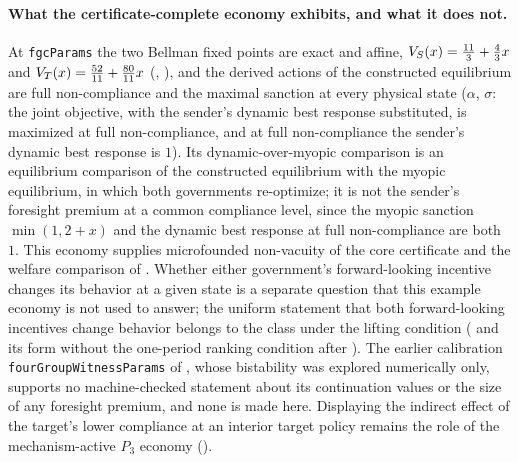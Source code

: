 \paragraph{What the certificate-complete economy exhibits, and what it does not.}
At \texttt{fgcParams} the two Bellman fixed points are exact and affine,
$V_S(x)=\tfrac{11}{3}+\tfrac43x$ and $V_T(x)=\tfrac{52}{11}+\tfrac{80}{11}x$
(, ), and the derived
actions of the constructed equilibrium are full non-compliance and the maximal
sanction at every physical state ($\alpha$,
$\sigma$: the joint objective, with the
sender's dynamic best response substituted, is maximized at full non-compliance, and at full
non-compliance the sender's dynamic best response is $1$). Its dynamic-over-myopic
comparison is an equilibrium comparison of the constructed equilibrium with the
myopic equilibrium, in which both governments re-optimize; it is not the
sender's foresight premium at a common compliance level, since the myopic sanction
$\min(1,2+x)$ and the dynamic best response at full non-compliance are both $1$. This economy supplies
microfounded non-vacuity of the core certificate and the welfare comparison
of . Whether either government's
forward-looking incentive changes its behavior at a given state is a
separate question that this example economy is not used to answer; the uniform
statement that both forward-looking incentives change behavior belongs to the class under the lifting condition
( and its form without the one-period ranking condition after
). The earlier calibration
\texttt{fourGroupWitnessParams} of , whose
bistability was explored numerically only, supports no machine-checked
statement about its continuation values or the size of any foresight premium, and none
is made here. Displaying the indirect effect of the target's lower compliance at an interior target policy
remains the role of the mechanism-active $P_3$ economy ().

